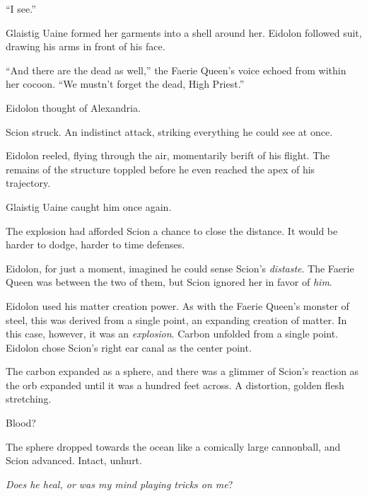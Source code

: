 ``I see.''



Glaistig Uaine formed her garments into a shell around her.  Eidolon followed suit, drawing his arms in front of his face.



``And there are the dead as well,'' the Faerie Queen's voice echoed from within her cocoon.  ``We mustn't forget the dead, High Priest.''



Eidolon thought of Alexandria.



Scion struck.  An indistinct attack, striking everything he could see at once.



Eidolon reeled, flying through the air, momentarily berift of his flight.  The remains of the structure toppled before he even reached the apex of his trajectory.



Glaistig Uaine caught him once again.



The explosion had afforded Scion a chance to close the distance.  It would be harder to dodge, harder to time defenses.



Eidolon, for just a moment, imagined he could sense Scion's \emph{distaste}.  The Faerie Queen was between the two of them, but Scion ignored her in favor of \emph{him}.



Eidolon used his matter creation power.  As with the Faerie Queen's monster of steel, this was derived from a single point, an expanding creation of matter.  In this case, however, it was an \emph{explosion}.  Carbon unfolded from a single point.  Eidolon chose Scion's right ear canal as the center point.



The carbon expanded as a sphere, and there was a glimmer of Scion's reaction as the orb expanded until it was a hundred feet across.  A distortion, golden flesh stretching.



Blood?



The sphere dropped towards the ocean like a comically large cannonball, and Scion advanced.  Intact, unhurt.



\emph{Does he heal, or was my mind playing tricks on me}?



